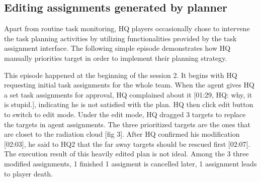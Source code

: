 \subsection{Editing assignments generated by planner}
Apart from routine task monitoring, HQ players occasionally chose to intervene the task planning activities by utilizing functionalities provided by the task assignment interface. The following simple episode demonstrates how HQ manually priorities target in order to implement their planning strategy. \\

\noindent{} 
\hfill \break

This episode happened at the beginning of the session 2. It begins with HQ requesting initial task assignments for the whole team. When the agent gives HQ  a set task assignments for approval, HQ complained about it [01:29, HQ: why, it is stupid.], indicating he is not satisfied with the plan. HQ then click edit button to switch to edit mode. Under the edit mode, HQ dragged 3 targets to replace the targets in agent assignments. The three prioritized targets are the ones that are closet to the radiation cloud [fig 3]. After HQ confirmed his modification [02:03], he said to HQ2 that the far away targets should be rescued first [02:07]. The execution result of this heavily edited plan is not ideal. Among the 3 three modified assignments, 1 finished 1 assigment is cancelled later, 1 assignment leads to player death.\\


